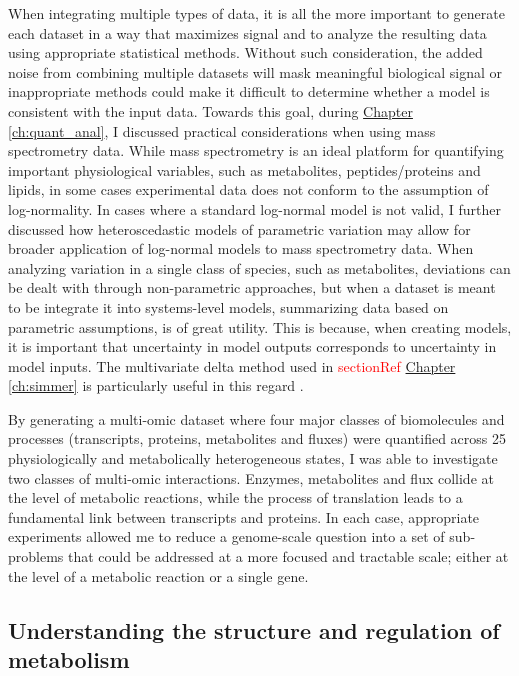 When integrating multiple types of data, it is all the more important to generate each dataset in a way that maximizes signal and to analyze the resulting data using appropriate statistical methods. Without such consideration, the added noise from combining multiple datasets will mask meaningful biological signal or inappropriate methods could make it difficult to determine whether a model is consistent with the input data. Towards this goal, during \hyperref[ch:quant_anal]{Chapter \ref{ch:quant_anal}}, I discussed practical considerations when using mass spectrometry data.  While mass spectrometry is an ideal platform for quantifying important physiological variables, such as metabolites, peptides/proteins and lipids, in some cases experimental data does not conform to the assumption of log-normality. In cases where a standard log-normal model is not valid, I further discussed how heteroscedastic models of parametric variation may allow for broader application of log-normal models to mass spectrometry data. When analyzing variation in a single class of species, such as metabolites, deviations can be dealt with through non-parametric approaches, but when a dataset is meant to be integrate it into systems-level models, summarizing data based on parametric assumptions, is of great utility.  This is because, when creating models, it is important that uncertainty in model outputs corresponds to uncertainty in model inputs. The multivariate delta method used in \textcolor{red}{sectionRef} \hyperref[ch:simmer]{Chapter \ref{ch:simmer}} is particularly useful in this regard \cite{Lynch:1998vx}.

By generating a multi-omic dataset where four major classes of biomolecules and processes (transcripts, proteins, metabolites and fluxes) were quantified across 25 physiologically and metabolically heterogeneous states, I was able to investigate two classes of multi-omic interactions. Enzymes, metabolites and flux collide at the level of metabolic reactions, while the process of translation leads to a fundamental link between transcripts and proteins. In each case, appropriate experiments allowed me to reduce a genome-scale question into a set of sub-problems that could be addressed at a more focused and tractable scale; either at the level of a metabolic reaction or a single gene.

\subsection{Understanding the structure and regulation of metabolism}

